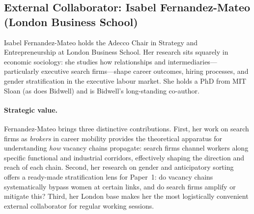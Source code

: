 \documentclass[a4paper]{tufte-handout}
\begin{document}
\subsection{External Collaborator: Isabel Fernandez-Mateo (London Business School)}


Isabel Fernandez-Mateo holds the Adecco Chair in Strategy and Entrepreneurship at London Business School.
Her research sits squarely in economic sociology: she studies how relationships and intermediaries---particularly executive search firms---shape career outcomes, hiring processes, and gender stratification in the executive labour market. She holds a PhD from MIT Sloan (as does Bidwell) and is Bidwell's long-standing co-author.

\paragraph{Strategic value.}
Fernandez-Mateo brings three distinctive contributions. First, her work on search firms as \emph{brokers} in career mobility provides the theoretical apparatus for understanding \emph{how} vacancy chains propagate: search firms channel workers along specific functional and industrial corridors, effectively shaping the direction and reach of each chain.
Second, her research on gender and anticipatory sorting offers a ready-made stratification lens for Paper~1: do vacancy chains systematically bypass women at certain links, and do search firms amplify or mitigate this?
Third, her London base makes her the most logistically convenient external collaborator for regular working sessions.
\end{document}
